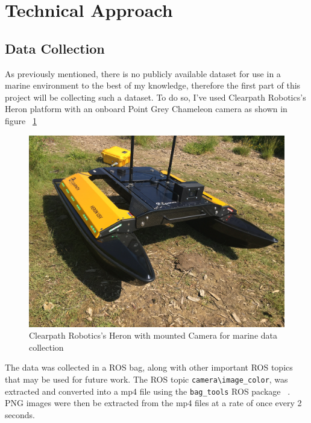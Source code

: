 \documentclass[10pt,twocolumn,letterpaper]{article}
\begin{document}

\section{Technical Approach}
\subsection{Data Collection}
As previously mentioned, there is no publicly available dataset for use in a marine
environment to the best of my knowledge, therefore the first part of this project
will be collecting such a dataset. To do so, I've used Clearpath Robotics's
Heron platform with an onboard Point Grey Chameleon camera as shown in figure ~\ref{fig:heron}

\begin{figure}[h]	
\begin{center}
  \includegraphics[width=1.0\linewidth]{heron.JPG}
\end{center}
   \caption{Clearpath Robotics's Heron with mounted Camera for marine data collection}
\label{fig:heron}
\end{figure}


The data was collected in a ROS bag, along with other important ROS topics that may be used
for future work. The ROS topic \verb|camera\image_color|, was extracted and 
converted into a mp4 file using the \verb|bag_tools| ROS package ~\cite{bagtools}. PNG images
were then be extracted from the mp4 files at a rate of once every 2 seconds.
\end{document}
